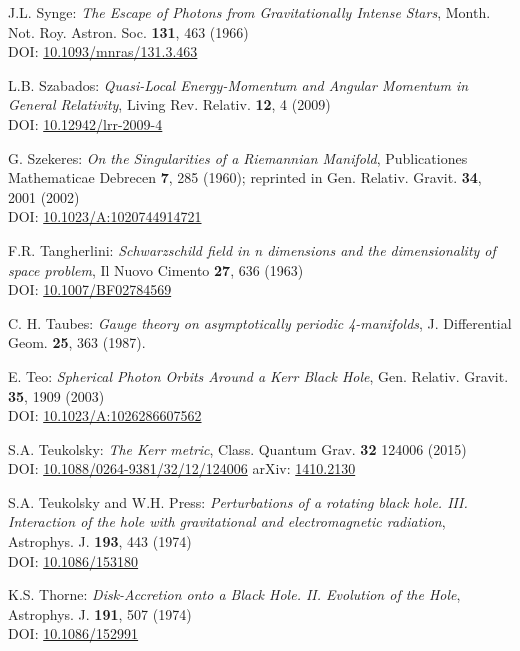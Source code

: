\begin{thebibliography}{123}
J.L. Synge: {\em The Escape of Photons from Gravitationally Intense Stars},
Month. Not. Roy. Astron. Soc. {\bf 131}, 463 (1966)\\
DOI: \href{https://doi.org/10.1093/mnras/131.3.463}{10.1093/mnras/131.3.463}

L.B. Szabados:
{\em Quasi-Local Energy-Momentum and Angular Momentum in General Relativity},
Living Rev. Relativ. {\bf 12}, 4 (2009)\\
DOI: \href{https://doi.org/10.12942/lrr-2009-4}{10.12942/lrr-2009-4}

G. Szekeres:
{\em On the Singularities of a Riemannian Manifold},
Publicationes Mathematicae Debrecen {\bf 7}, 285 (1960); reprinted in
Gen. Relativ. Gravit. {\bf 34}, 2001 (2002)\\
DOI: \href{https://doi.org/10.1023/A:1020744914721}{10.1023/A:1020744914721}

F.R. Tangherlini:
{\em Schwarzschild field in n dimensions and the dimensionality of space problem},
Il Nuovo Cimento {\bf 27}, 636 (1963)\\
DOI: \href{https://doi.org/10.1007/BF02784569}{10.1007/BF02784569}

C. H. Taubes:
{\em Gauge theory on asymptotically periodic 4-manifolds},
J. Differential Geom. {\bf 25}, 363 (1987).

E. Teo:
{\em Spherical Photon Orbits Around a Kerr Black Hole},
Gen. Relativ. Gravit. {\bf 35}, 1909 (2003)\\
DOI: \href{https://doi.org/10.1023/A:1026286607562}{10.1023/A:1026286607562}

S.A. Teukolsky:
{\em The Kerr metric},
Class. Quantum Grav. {\bf 32} 124006 (2015)\\
DOI: \href{https://doi.org/10.1088/0264-9381/32/12/124006}{10.1088/0264-9381/32/12/124006}\hfill
arXiv: \href{https://arxiv.org/abs/1410.2130}{1410.2130}

S.A. Teukolsky and W.H. Press:
{\em Perturbations of a rotating black hole. III. Interaction of the hole with gravitational and electromagnetic radiation},
Astrophys. J. {\bf 193}, 443 (1974)\\
DOI: \href{https://doi.org/10.1086/153180}{10.1086/153180}

K.S. Thorne:
{\em Disk-Accretion onto a Black Hole. II. Evolution of the Hole},
Astrophys. J. {\bf 191}, 507 (1974)\\
DOI: \href{https://doi.org/10.1086/152991}{10.1086/152991}


\end{thebibliography}
